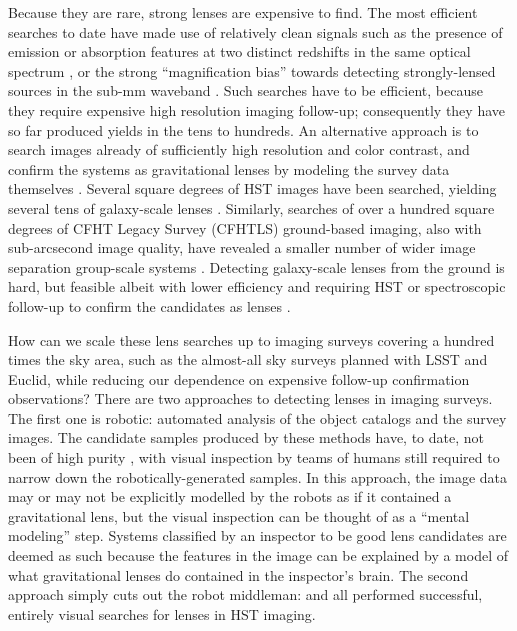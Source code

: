 \documentclass[useAMS,usenatbib,a4paper]{mn2e}
\begin{document}

Because they are rare, strong lenses are expensive to find. The most efficient
searches to date have made use of relatively clean signals such as the
presence of emission or absorption features at two distinct redshifts in the
same optical spectrum \citep[e.g.][]{BoltonEtal2004}, or the strong
``magnification bias'' towards detecting strongly-lensed sources in the sub-mm
waveband \citep[e.g.][]{NegrelloEtal2010}. Such searches have to be efficient,
because they require expensive high resolution imaging follow-up; consequently
they have so far produced yields in the tens to hundreds. An alternative
approach is to search images already of sufficiently high resolution and color
contrast, and confirm the systems as gravitational lenses by modeling the
survey data themselves \citep[][]{MarshallEtal2009}. Several square degrees of
HST images have been searched, yielding several tens of galaxy-scale lenses
\citep[e.g.][]{MoustakasEtal2007,FaureEtal2008,Jackson2008,MoreEtal2012,
PawaseEtal2014}. Similarly, searches of over a hundred square degrees of CFHT
Legacy Survey (CFHTLS) ground-based imaging, also with sub-arcsecond image quality,
have revealed a smaller number of wider image separation group-scale systems
\citep[e.g.][]{CabanacEtal2007,MoreEtal2012}. Detecting galaxy-scale lenses
from the ground is hard, but feasible albeit with lower efficiency and requiring
HST or spectroscopic follow-up to confirm the candidates as lenses
\citep[e.g.][]{GavazziEtal2014}.


How can we scale these lens searches up to imaging surveys covering a hundred
times the sky area, such as the almost-all sky surveys planned with LSST and
Euclid, while reducing our dependence on expensive follow-up confirmation
observations? There are two approaches to detecting lenses in imaging surveys.
The first one is robotic: automated analysis of the object catalogs and the
survey images. The candidate samples produced by these methods have, to date,
not been of high purity  \citep[see
e.g.][]{MarshallEtal2009,MoreEtal2012,GavazziEtal2014}, with visual inspection
by teams of humans still required to narrow down the robotically-generated
samples. In this approach, the image data may or may not be explicitly
modelled by the robots as if it contained a gravitational lens, but the visual
inspection can be thought of as a ``mental modeling'' step. Systems classified
by an inspector to be good lens candidates are deemed as such because the
features in the image can be explained by a model of what gravitational lenses
do contained in the inspector's brain. The second approach simply cuts out the
robot middleman: \citet{MoustakasEtal2007,FaureEtal2008,Jackson2008} and
\citet{PawaseEtal2014} all performed successful, entirely visual searches for
lenses in HST imaging.
\end{document}
